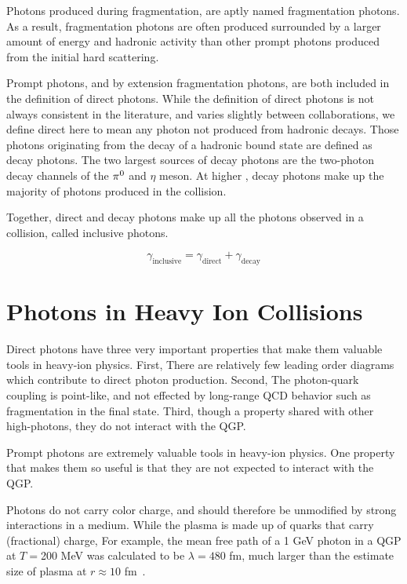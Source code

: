 
Photons produced during fragmentation, are aptly named fragmentation photons. As a result, fragmentation photons are often produced surrounded by a larger amount of energy and hadronic activity than other prompt photons produced from the initial hard scattering.

Prompt photons, and by extension fragmentation photons, are both included in the definition of direct photons. While the definition of direct photons is not always consistent in the literature, and varies slightly between collaborations, we define direct here to mean any photon not produced from hadronic decays. Those photons originating from the decay of a hadronic bound state are defined as decay photons. The two largest sources of decay photons are the two-photon decay channels of the $\pi^0$ and $\eta$ meson. At higher \pt, decay photons make up the majority of photons produced in the collision.

Together, direct and decay photons make up all the photons observed in a collision, called inclusive photons.

$$ \gamma_\mathrm{inclusive} = \gamma_\mathrm{direct} + \gamma_\mathrm{decay}$$

\section{Photons in Heavy Ion Collisions}
Direct photons have three very important properties that make them valuable tools in heavy-ion physics. First, There are relatively few leading order diagrams which contribute to direct photon production. Second, The photon-quark coupling is point-like, and not effected by long-range QCD behavior such as fragmentation in the final state. Third, though a property shared with other high-\pt photons, they do not interact with the QGP.


Prompt photons are extremely valuable tools in heavy-ion physics. One property that makes them so useful is that they are not expected to interact with the QGP.

Photons do not carry color charge, and should therefore be unmodified by strong interactions in a medium. While the plasma is made up of quarks that carry (fractional) charge, For example, the mean free path of a 1 GeV photon in a QGP at $T=$200 MeV was calculated to be  $\lambda=480$ fm, much larger than the estimate size of plasma at  $r \approx 10$ fm~\cite{David2020}.


